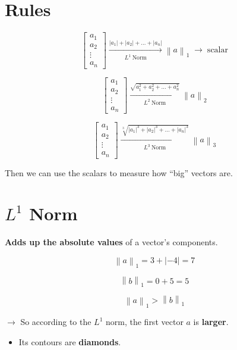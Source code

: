 \documentclass[11pt,a4paper]{article}
\newcommand{\norm}[1]{\left\lVert #1 \right\rVert}
\begin{document}
\section{Rules}

\[
  \begin{bmatrix} a_1 \\ a_2 \\ \vdots \\ a_n \end{bmatrix}
  \xrightarrow[L^1\ \text{Norm}]{|a_1| + |a_2| + \dots + |a_n|}
  \norm{a}_1 \;\rightarrow\; \text{scalar}
\]

\[
  \begin{bmatrix} a_1 \\ a_2 \\ \vdots \\ a_n \end{bmatrix}
  \xrightarrow[L^2\ \text{Norm}]{\sqrt{a_1^2 + a_2^2 + \dots + a_n^2}}
  \norm{a}_2
\]

\[
  \begin{bmatrix} a_1 \\ a_2 \\ \vdots \\ a_n \end{bmatrix}
  \xrightarrow[L^3\ \text{Norm}]{\sqrt[3]{|a_1|^3 + |a_2|^3 + \dots + |a_n|^3}}
  \norm{a}_3
\]

Then we can use the scalars to measure how ``big'' vectors are.

\section{$L^1$ Norm}

\begin{callout}
\textbf{Adds up the absolute values} of a vector's components.
\end{callout}

\[
  \norm{a}_1 = 3 + |{-4}| = 7
\]

\[
  \norm{b}_1 = 0 + 5 = 5
\]

\[
  \norm{a}_1 > \norm{b}_1
\]

$\rightarrow$ So according to the $L^1$ norm, the first vector $a$ is \textbf{larger}.

\begin{itemize}
  \item Its contours are \textbf{diamonds}.
\end{itemize}
\end{document}
